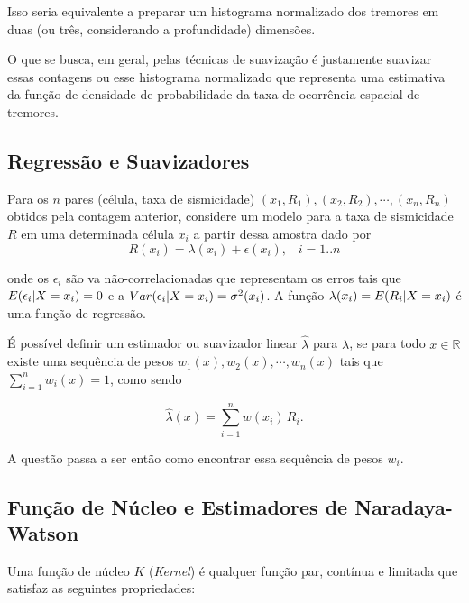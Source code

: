 Isso seria equivalente a preparar um histograma normalizado 
dos tremores em duas (ou três, considerando a profundidade) dimensões.

O que se busca, em geral, pelas técnicas de suavização é justamente suavizar essas contagens ou esse histograma
normalizado que representa uma estimativa da função de densidade de probabilidade da taxa de ocorrência espacial de tremores. 


\subsection{Regressão e Suavizadores}


Para os $n$ pares (célula, taxa de sismicidade) $(x_1, R_1), (x_2, R_2), \cdots, (x_n, R_n)$
obtidos pela contagem anterior, considere um modelo para a taxa de sismicidade $R$ 
em uma determinada célula $x_i$ a partir dessa amostra dado por
\begin{equation}
	\ensuremath{
		R(x_i) = \lambda(x_i) + \epsilon(x_i),\;\;\; i=1..n
	}
\label{eq:rate_model}
\end{equation}

onde os $\epsilon_i$ são \gls{va} não-correlacionadas que representam os erros 
tais que $E(\epsilon_i \arrowvert X = x_i) = 0$ 
e a  $Var(\epsilon_i \arrowvert X = x_i) = \sigma^2(x_i)$. A função  
$\lambda(x_i) = E(R_i \arrowvert X = x_i)$ é uma função de regressão.

É possível definir um estimador ou suavizador linear $\hat{\lambda}$ para $\lambda$, 
se para todo $x \in \mathbb{R}$ existe uma sequência de pesos $w_1(x), w_2(x),\cdots,w_n(x)$ tais que
$\sum_{i=1}^{n}w_i(x) = 1$, como sendo

\begin{equation}
	\ensuremath{
		\hat{\lambda}(x) = \sum_{i=1}^{n}w(x_i)\,R_i.
	}
\label{eq:rate_estim}
\end{equation}

A questão passa a ser então como encontrar essa sequência de pesos $w_i$.

\subsection{Função de Núcleo e Estimadores de Naradaya-Watson}

Uma função de núcleo $K$ (\emph{Kernel}) é qualquer função par, contínua e limitada que satisfaz as seguintes
propriedades:

